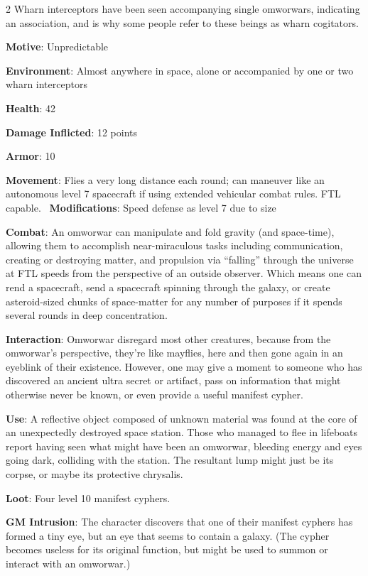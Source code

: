 \begin{multicols}{2}
Wharn interceptors have been seen accompanying single omworwars, indicating an association, and is why some people refer to these beings as wharn cogitators.

\textbf{Motive}: Unpredictable 

\textbf{Environment}: Almost anywhere in space, alone or accompanied by one or two wharn interceptors 

\textbf{Health}: 42 

\textbf{Damage Inflicted}:  12 points 

\textbf{Armor}: 10 

\textbf{Movement}: Flies a very long distance each round; can maneuver like an autonomous level 7 spacecraft if using extended vehicular combat rules. FTL capable. 
\textbf{Modifications}: Speed defense as level 7 due to size 

\textbf{Combat}: An omworwar can manipulate and fold gravity (and space-time), allowing them to accomplish near-miraculous tasks including communication, creating or destroying matter, and propulsion via “falling” through the universe at FTL speeds from the perspective of an outside observer. Which means one can rend a spacecraft, send a spacecraft spinning through the galaxy, or create asteroid-sized chunks of space-matter for any number of purposes if it spends several rounds in deep concentration. 

\textbf{Interaction}: Omworwar disregard most other creatures, because from the omworwar’s perspective, they’re like mayflies, here and then gone again in an eyeblink of their existence. However, one may give a moment to someone who has discovered an ancient ultra secret or artifact, pass on information that might otherwise never be known, or even provide a useful manifest cypher. 

\textbf{Use}: A reflective object composed of unknown material was found at the core of an unexpectedly destroyed space station. Those who managed to flee in lifeboats report having seen what might have been an omworwar, bleeding energy and eyes going dark, colliding with the station. The resultant lump might just be its corpse, or maybe its protective chrysalis. 

\textbf{Loot}: Four level 10 manifest cyphers.

\textbf{GM Intrusion}: The character discovers that one of their manifest cyphers has formed a tiny eye, but an eye that seems to contain a galaxy. (The cypher becomes useless for its original function, but might be used to summon or interact with an omworwar.)


\end{multicols}
